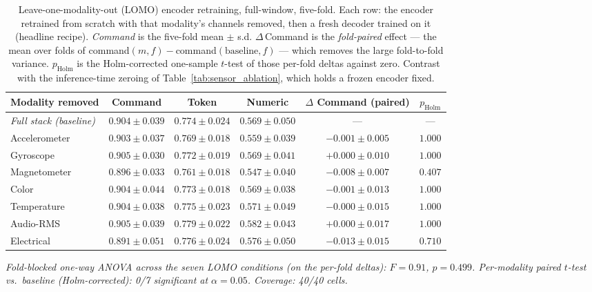 \begin{table}[ht]
\centering
\caption{Leave-one-modality-out (LOMO) encoder retraining, full-window, five-fold. Each row: the encoder retrained from scratch with that modality's channels removed, then a fresh decoder trained on it (headline recipe). \emph{Command} is the five-fold mean $\pm$ s.d. $\Delta$\,Command is the \emph{fold-paired} effect --- the mean over folds of command$(m,f)-$command$(\text{baseline},f)$ --- which removes the large fold-to-fold variance. $p_{\text{Holm}}$ is the Holm-corrected one-sample $t$-test of those per-fold deltas against zero. Contrast with the inference-time zeroing of Table~\ref{tab:sensor_ablation}, which holds a frozen encoder fixed.}
\label{tab:lomo_modality}
\small
\begin{tabular}{l c c c c c}
\toprule
\textbf{Modality removed} & \textbf{Command} & \textbf{Token} & \textbf{Numeric} & \textbf{$\Delta$ Command (paired)} & \textbf{$p_{\text{Holm}}$} \\
\midrule
\textit{Full stack (baseline)} & $0.904 \pm 0.039$ & $0.774 \pm 0.024$ & $0.569 \pm 0.050$ & --- & --- \\
Accelerometer & $0.903 \pm 0.037$ & $0.769 \pm 0.018$ & $0.559 \pm 0.039$ & $-0.001 \pm 0.005$ & $1.000$ \\
Gyroscope & $0.905 \pm 0.030$ & $0.772 \pm 0.019$ & $0.569 \pm 0.041$ & $+0.000 \pm 0.010$ & $1.000$ \\
Magnetometer & $0.896 \pm 0.033$ & $0.761 \pm 0.018$ & $0.547 \pm 0.040$ & $-0.008 \pm 0.007$ & $0.407$ \\
Color & $0.904 \pm 0.044$ & $0.773 \pm 0.018$ & $0.569 \pm 0.038$ & $-0.001 \pm 0.013$ & $1.000$ \\
Temperature & $0.904 \pm 0.038$ & $0.775 \pm 0.023$ & $0.571 \pm 0.049$ & $-0.000 \pm 0.015$ & $1.000$ \\
Audio-RMS & $0.905 \pm 0.039$ & $0.779 \pm 0.022$ & $0.582 \pm 0.043$ & $+0.000 \pm 0.017$ & $1.000$ \\
Electrical & $0.891 \pm 0.051$ & $0.776 \pm 0.024$ & $0.576 \pm 0.050$ & $-0.013 \pm 0.015$ & $0.710$ \\
\bottomrule
\end{tabular}
\par\smallskip
\footnotesize\textit{Fold-blocked one-way ANOVA across the seven LOMO conditions (on the per-fold deltas): $F=0.91$, $p=0.499$. Per-modality paired $t$-test vs.\ baseline (Holm-corrected): 0/7 significant at $\alpha=0.05$. Coverage: 40/40 cells.}
\end{table}
